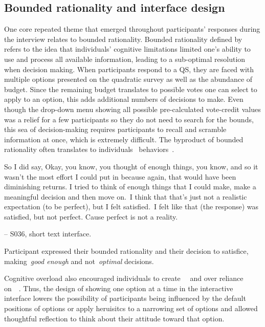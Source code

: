 \subsection{Bounded rationality and interface design}
One core repeated theme that emerged throughout participants' responses during the interview relates to bounded rationality. Bounded rationality defined by~\textcite{simonBehavioralModelRational1955} refers to the idea that individuals' cognitive limitations limited one's ability to use and process all available information, leading to a sub-optimal resolution when decision making. When participants respond to a QS, they are faced with multiple options presented on the quadratic survey as well as the abundance of budget. Since the remaining budget translates to possible votes one can select to apply to an option, this adds additional numbers of decisions to make. Even though the drop-down menu showing all possible pre-calculated vote-credit values was a relief for a few participants so they do not need to search for the bounds, this sea of decision-making requires participants to recall and scramble information at once, which is extremely difficult. The byproduct of bounded rationality often translates to individuals~\underline{} behaviors~\cite{gigerenzerReasoningFastFrugal1996}.

\begin{displayquote}
So I did say, Okay, you know, you thought of enough things, you know, and so it wasn't the most effort I could put in because again, that would have been diminishing returns. I tried to think of enough things that I could make, make a meaningful decision and then move on.~\bracketellipsis I think that that's just not a realistic expectation (to be perfect), but I felt satisfied.~\bracketellipsis I felt like that (the response) was satisfied, but not perfect. Cause perfect is not a reality.

\noindent \hfill -- S036, short text interface.
\end{displayquote}

Participant expressed their bounded rationality and their decision to satisfice, making~\textit{good enough} and not~\textit{optimal} decisions.

Cognitive overload also encouraged individuals to create~\underline{}~\cite{tverskyJudgmentUncertaintyHeuristics1974} and over reliance on~\underline{}~\cite{thalerNudgeImprovingDecisions2008a}. Thus, the design of showing one option at a time in the interactive interface lowers the possibility of participants being influenced by the default positions of options or apply heruisitcs to a narrowing set of options and allowed thoughtful reflection to think about their attitude toward that option.

